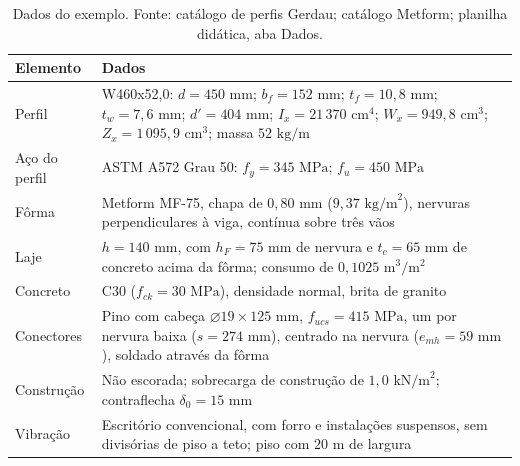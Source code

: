 \documentclass[11pt,a4paper]{article}
\begin{document}
\begin{table}[!htbp]
  \centering
  \caption{Dados do exemplo. Fonte: catálogo de perfis Gerdau; catálogo Metform; planilha didática, aba Dados.}
  \label{tab:dados-exemplo}
  \small
  \begin{tabularx}{\linewidth}{lX}
    \toprule
    \textbf{Elemento} & \textbf{Dados} \\
    \midrule
    Perfil & W460x52,0: $d = 450\text{ mm}$; $b_f = 152\text{ mm}$; $t_f = 10{,}8\text{ mm}$; $t_w = 7{,}6\text{ mm}$; $d' = 404\text{ mm}$; $I_x = 21\,370\text{ cm}^4$; $W_x = 949{,}8\text{ cm}^3$; $Z_x = 1\,095{,}9\text{ cm}^3$; massa $52\text{ kg/m}$ \\
    Aço do perfil & ASTM A572 Grau 50: $f_y = 345\text{ MPa}$; $f_u = 450\text{ MPa}$ \\
    Fôrma & Metform MF-75, chapa de $0{,}80\text{ mm}$ ($9{,}37\text{ kg/m}^2$), nervuras perpendiculares à viga, contínua sobre três vãos \\
    Laje & $h = 140\text{ mm}$, com $h_F = 75\text{ mm}$ de nervura e $t_c = 65\text{ mm}$ de concreto acima da fôrma; consumo de $0{,}1025\text{ m}^3/\text{m}^2$ \\
    Concreto & C30 ($f_{ck} = 30\text{ MPa}$), densidade normal, brita de granito \\
    Conectores & Pino com cabeça $\varnothing 19 \times 125\text{ mm}$, $f_{ucs} = 415\text{ MPa}$, um por nervura baixa ($s = 274\text{ mm}$), centrado na nervura ($e_{mh} = 59\text{ mm}$), soldado através da fôrma \\
    Construção & Não escorada; sobrecarga de construção de $1{,}0\text{ kN/m}^2$; contraflecha $\delta_0 = 15\text{ mm}$ \\
    Vibração & Escritório convencional, com forro e instalações suspensos, sem divisórias de piso a teto; piso com $20\text{ m}$ de largura \\
    \bottomrule
  \end{tabularx}
\end{table}
\end{document}
